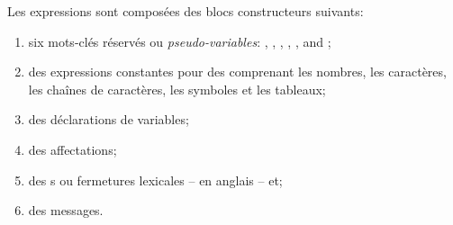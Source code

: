 \documentclass[a4paper,10pt,twoside]{book}
\begin{document}
Les expressions sont compos\'{e}es des blocs constructeurs suivants:
\begin{enumerate}[label=(\small\itshape\roman{*}), ref=(\small\itshape\roman{*})]
\item six mots-cl\'{e}s r\'{e}serv\'{e}s ou \emph{pseudo-variables}:
, , , , , and ;
\item des expressions constantes pour des  comprenant les nombres, les caract\`{e}res, les chaînes de caract\`{e}res, les symboles et les tableaux;
\item des d\'{e}clarations de variables;
\item des affectations;
\item des s ou fermetures lexicales --  en anglais -- et;
\item des messages.
\end{enumerate}
\end{document}
